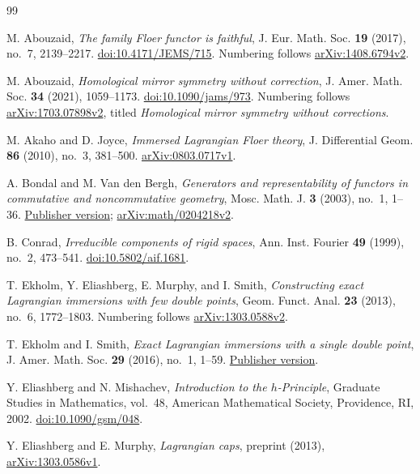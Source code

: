 \documentclass[11pt]{article}
\theoremstyle{definition}
\theoremstyle{remark}
\numberwithin{equation}{section}
\begin{document}
\begin{thebibliography}{99}

M. Abouzaid,
\emph{The family Floer functor is faithful},
J. Eur. Math. Soc. \textbf{19} (2017), no.~7, 2139--2217.
\href{https://doi.org/10.4171/JEMS/715}{doi:10.4171/JEMS/715}.
Numbering follows \href{https://arxiv.org/abs/1408.6794v2}{arXiv:1408.6794v2}.

M. Abouzaid,
\emph{Homological mirror symmetry without correction},
J. Amer. Math. Soc. \textbf{34} (2021), 1059--1173.
\href{https://doi.org/10.1090/jams/973}{doi:10.1090/jams/973}.
Numbering follows \href{https://arxiv.org/abs/1703.07898v2}{arXiv:1703.07898v2},
titled \emph{Homological mirror symmetry without corrections}.

M. Akaho and D. Joyce,
\emph{Immersed Lagrangian Floer theory},
J. Differential Geom. \textbf{86} (2010), no.~3, 381--500.
\href{https://arxiv.org/abs/0803.0717v1}{arXiv:0803.0717v1}.

A. Bondal and M. Van den Bergh,
\emph{Generators and representability of functors in commutative and
noncommutative geometry},
Mosc. Math. J. \textbf{3} (2003), no.~1, 1--36.
\href{https://doi.org/10.17323/1609-4514-2003-3-1-1-36}{Publisher version};
\href{https://arxiv.org/abs/math/0204218v2}{arXiv:math/0204218v2}.

B. Conrad,
\emph{Irreducible components of rigid spaces},
Ann. Inst. Fourier \textbf{49} (1999), no.~2, 473--541.
\href{https://doi.org/10.5802/aif.1681}{doi:10.5802/aif.1681}.

T. Ekholm, Y. Eliashberg, E. Murphy, and I. Smith,
\emph{Constructing exact Lagrangian immersions with few double points},
Geom. Funct. Anal. \textbf{23} (2013), no.~6, 1772--1803.
Numbering follows \href{https://arxiv.org/abs/1303.0588v2}{arXiv:1303.0588v2}.

T. Ekholm and I. Smith,
\emph{Exact Lagrangian immersions with a single double point},
J. Amer. Math. Soc. \textbf{29} (2016), no.~1, 1--59.
\href{https://doi.org/10.1090/S0894-0347-2015-00825-6}{Publisher version}.

Y. Eliashberg and N. Mishachev,
\emph{Introduction to the $h$-Principle},
Graduate Studies in Mathematics, vol.~48,
American Mathematical Society, Providence, RI, 2002.
\href{https://doi.org/10.1090/gsm/048}{doi:10.1090/gsm/048}.

Y. Eliashberg and E. Murphy,
\emph{Lagrangian caps},
preprint (2013), \href{https://arxiv.org/abs/1303.0586v1}{arXiv:1303.0586v1}.


\end{thebibliography}
\end{document}
